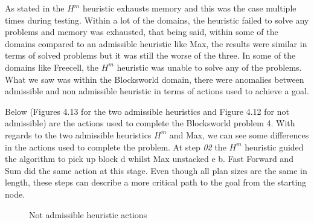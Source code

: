 As stated in \cite{HmHeuristic} the $H^m$ heuristic exhausts memory and this was the case multiple times during testing. Within a lot of the domains, the heuristic failed to solve any problems and memory was exhausted, that being said, within some of the domains compared to an admissible heuristic like Max, the results were similar in terms of solved problems but it was still the worse of the three. In some of the domains like Freecell, the $H^m$ heuristic was unable to solve any of the problems. 
What we saw was within the Blocksworld domain, there were anomalies between admissible and non admissible heuristic in terms of actions used to achieve a goal. 

Below (Figures 4.13 for the two admissible heuristics and Figure 4.12 for not admissible)  are the actions used to complete the Blocksworld problem 4. With regards to the two admissible heuristics $H^m$ and Max, we can see some differences in the actions used to complete the problem. At step \textit{02} the $H^m$ heuristic guided the algorithm to pick up block d whilst Max unstacked e b. Fast Forward and Sum did the same action at this stage. Even though all plan sizes are the same in length, these steps can describe a more critical path to the goal from the starting node.
\begin{figure}[!tbp]
  \centering
  \hfill
  \caption{Not admissible heuristic actions}
\end{figure}
